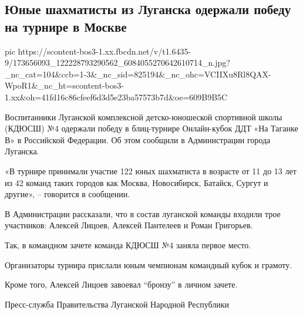  
 
 
 
 

\subsection{Юные шахматисты из Луганска одержали победу на турнире в Москве}

\ifcmt
  pic https://scontent-bos3-1.xx.fbcdn.net/v/t1.6435-9/173656093_122228793290562_6084055270642610714_n.jpg?_nc_cat=104&ccb=1-3&_nc_sid=825194&_nc_ohc=VCIIXu8Rl8QAX-WpoR1&_nc_ht=scontent-bos3-1.xx&oh=41fd16c86cfeef6d3d5e23ba57573b7d&oe=609B9B5C
\fi

Воспитанники Луганской комплексной детско-юношеской спортивной школы (КДЮСШ) №4
одержали победу в блиц-турнире Онлайн-кубок ДДТ «На Таганке В» в Российской
Федерации. Об этом сообщили в Администрации города Луганска.

«В турнире принимали участие 122 юных шахматиста в возрасте от 11 до 13 лет из
42 команд таких городов как Москва, Новосибирск, Батайск, Сургут и другие», –
говорится в сообщении.

В Администрации рассказали, что в состав луганской команды входили трое
участников: Алексей Лицоев, Алексей Пантелеев и Роман Григорьев.

Так, в командном зачете команда КДЮСШ №4 заняла первое место.

Организаторы турнира прислали юным чемпионам командный кубок и грамоту.

Кроме того, Алексей Лицоев завоевал \enquote{бронзу} в личном зачете.

Пресс-служба Правительства Луганской Народной Республики
